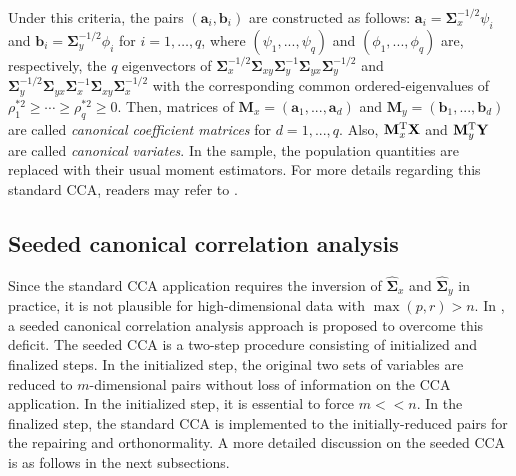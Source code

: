 Under this criteria, the pairs $(\mathbf{a}_i, \mathbf{b}_i)$
are constructed as follows:
$\mathbf{a}_i=\boldsymbol{\Sigma}_x^{-1/2}\psi_i$ and
$\mathbf{b}_i=\boldsymbol{\Sigma}_y^{-1/2}\phi_i$ for
$i = 1,\ldots,q$, where $(\psi_1,...,\psi_q)$ and $(\phi_1,...,\phi_q)$
are, respectively, the $q$ eigenvectors of
$\boldsymbol{\Sigma}_x^{-1/2} \boldsymbol{\Sigma}_{xy}
\boldsymbol{\Sigma}_y^{-1} \boldsymbol{\Sigma}_{yx}
\boldsymbol{\Sigma}_y^{-1/2}$
and $\boldsymbol{\Sigma}_y^{-1/2} \boldsymbol{\Sigma}_{yx}
\boldsymbol{\Sigma}_x^{-1}\boldsymbol{\Sigma}_{xy}
\boldsymbol{\Sigma}_x^{-1/2}$
with the corresponding common ordered-eigenvalues of
$\rho_1^{*2}\ge\cdots\ge\rho_q^{*2}\ge0$.
Then, matrices of $\mathbf{M}_{x} = (\mathbf{a}_1, ... ,\mathbf{a}_d)$
and $\mathbf{M}_{y} = (\mathbf{b}_1, ... ,\mathbf{b}_d)$ are called
\textit{canonical coefficient matrices} for $d=1, ..., q$.
Also, $\mathbf{M}_x^{\rm T}\mathbf{X}$ and $\mathbf{M}_y^{\rm T}\mathbf{Y}$
are called \textit{canonical variates}.
In the sample, the population quantities are replaced with their usual moment estimators.
For more details regarding this standard CCA,
readers may refer to \cite{johnson}.

\subsection{Seeded canonical correlation analysis}
Since the standard CCA application requires the inversion of
$\hat{\boldsymbol{\Sigma}}_x$ and $\hat{\boldsymbol{\Sigma}}_y$ in practice,
it is not plausible for high-dimensional data with $\max(p,r)>n$.
In \cite{scca}, a seeded canonical correlation analysis approach
is proposed to overcome this deficit.
The seeded CCA is a two-step procedure consisting of
initialized and finalized steps.
In the initialized step, the original two sets of variables are reduced
to $m$-dimensional pairs without loss of information on the CCA application.
In the initialized step, it is essential to force $m<<n$.
In the finalized step, the standard CCA is implemented
to the initially-reduced pairs for the repairing and orthonormality.
A more detailed discussion on the seeded CCA is as follows in the next subsections.

